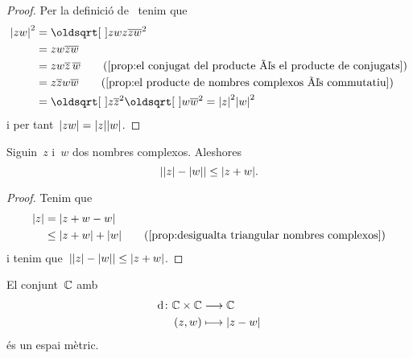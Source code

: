 \documentclass[../Apunts.tex]{subfiles}
\begin{document}
	\begin{proof}
		Per la definició de~ tenim que
		\begin{align*}
			\modul{zw}^{2}&=\sqrt{zwz\conjugat{zw}}^{2} \\
			&=zw\conjugat{zw} \\
			&=zw\conjugat{z}\,\conjugat{w}
			\tag{\ref{prop:el conjugat del producte és el producte de conjugats}} \\
			&=z\conjugat{z}w\conjugat{w}
			\tag{\ref{prop:el producte de nombres complexos és commutatiu}} \\
			&=\sqrt{z\conjugat{z}}^{2}\sqrt{w\conjugat{w}}^{2}=\modul{z}^{2}\modul{w}^{2}
		\end{align*}
		i per tant~\(\modul{zw}=\modul{z}\modul{w}\).
	\end{proof}
	\begin{proposition}
		\label{prop:el valor absolut de la resta de mòduls és més petit o igual que el mòdul de la suma}
		Siguin~\(z\) i~\(w\) dos nombres complexos.
		Aleshores
		\[\abs{\modul{z}-\modul{w}}\leq\modul{z+w}.\]
	\end{proposition}
	\begin{proof}
		Tenim que
		\begin{align*}
			\modul{z}&=\modul{z+w-w} \\
			&\leq\modul{z+w}+\modul{w}
			\tag{\ref{prop:desigualta triangular nombres complexos}}
		\end{align*}
		i tenim que~\(\abs{\modul{z}-\modul{w}}\leq\modul{z+w}\).
	\end{proof}
	\begin{proposition}
		\label{prop:els complexos són un espai mètric}
		El conjunt~\(\mathbb{C}\) amb
		\begin{align*}
			\distancia\colon\CC\times\CC&\longrightarrow\CC \\
			(z,w)&\longmapsto\modul{z-w}
		\end{align*}
		és un espai mètric.
	\end{proposition}
\end{document}
